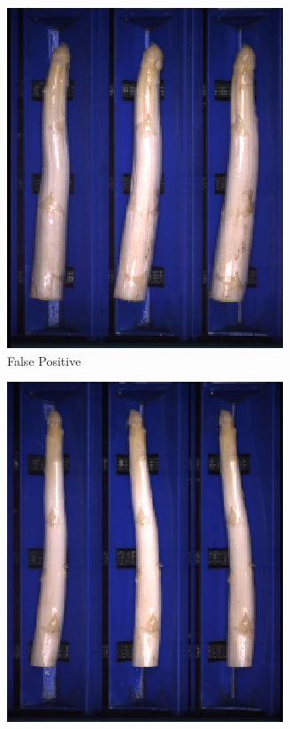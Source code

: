 \begin{figure}[!htb]
	\begin{subfigure}{0.3\textwidth}
		\includegraphics[width=0.9\linewidth]{Figures/chapter04/bent_falsepositive_01.png}
		\vspace{-5pt}
		\caption{False Positive}
	\end{subfigure}
	\begin{subfigure}{0.3\textwidth}
		\includegraphics[width=0.9\linewidth]{Figures/chapter04/bent_falsepositive_02.png}

\end{subfigure}
\end{figure}

